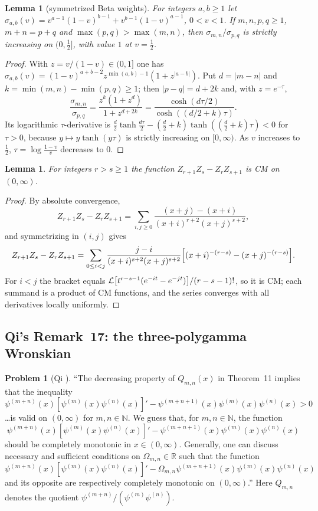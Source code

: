 \documentclass[11pt]{amsart}
\newtheorem{lemma}[theorem]{Lemma}
\theoremstyle{definition}
\newtheorem{problem}[theorem]{Problem}
\theoremstyle{remark}
\begin{document}
\begin{lemma}[symmetrized Beta weights]\label{R2:lem:cosh}
For integers $a,b\ge1$ let
$\sigma_{a,b}(v)=v^{a-1}(1-v)^{b-1}+v^{b-1}(1-v)^{a-1}$, $0<v<1$.
If $m,n,p,q\ge1$, $m+n=p+q$ and $\max(p,q)>\max(m,n)$, then
$\sigma_{m,n}/\sigma_{p,q}$ is strictly increasing on $(0,\tfrac12]$, with
value $1$ at $v=\tfrac12$.
\end{lemma}
\begin{proof}
With $z=v/(1-v)\in(0,1]$ one has
$\sigma_{a,b}(v)=(1-v)^{a+b-2}z^{\min(a,b)-1}(1+z^{|a-b|})$. Put $d=|m-n|$
and $k=\min(m,n)-\min(p,q)\ge1$; then $|p-q|=d+2k$ and, with $z=e^{-\tau}$,
\[
 \frac{\sigma_{m,n}}{\sigma_{p,q}}=\frac{z^k(1+z^d)}{1+z^{d+2k}}
 =\frac{\cosh(d\tau/2)}{\cosh((d/2+k)\tau)} .
\]
Its logarithmic $\tau$-derivative is
$\frac d2\tanh\frac{d\tau}2-(\frac d2+k)\tanh((\frac d2+k)\tau)<0$ for
$\tau>0$, because $y\mapsto y\tanh(y\tau)$ is strictly increasing on
$[0,\infty)$. As $v$ increases to $\frac12$, $\tau=\log\frac{1-v}{v}$
decreases to $0$.
\end{proof}

\begin{lemma}\label{R2:lem:hurwitz}
For integers $r>s\ge1$ the function $Z_{r+1}Z_s-Z_rZ_{s+1}$ is CM on
$(0,\infty)$.
\end{lemma}
\begin{proof}
By absolute convergence,
\[
 Z_{r+1}Z_s-Z_rZ_{s+1}=\sum_{i,j\ge0}\frac{(x+j)-(x+i)}{(x+i)^{r+2}(x+j)^{s+2}} ,
\]
and symmetrizing in $(i,j)$ gives
\[
 Z_{r+1}Z_s-Z_rZ_{s+1}=\sum_{0\le i<j}\frac{j-i}{(x+i)^{s+2}(x+j)^{s+2}}
 \Bigl[(x+i)^{-(r-s)}-(x+j)^{-(r-s)}\Bigr].
\]
For $i<j$ the bracket equals
$\mathcal{L}\bigl[t^{r-s-1}(e^{-it}-e^{-jt})\bigr]/(r-s-1)!$, so it is CM; each
summand is a product of CM functions, and the series converges with all
derivatives locally uniformly.
\end{proof}

\subsection{Qi's Remark~17: the three-polygamma Wronskian}
\label{R2:subsec:A}

\begin{problem}[{Qi \cite[Remark~17]{R2-QiCR2022}}]\label{R2:prob:A}
``The decreasing property of $Q_{m,n}(x)$ in Theorem~11 implies that the inequality
\[
 \psi^{(m+n)}(x)[\psi^{(m)}(x)\psi^{(n)}(x)]'-\psi^{(m+n+1)}(x)\psi^{(m)}(x)\psi^{(n)}(x)>0
\]
\dots is valid on $(0,\infty)$ for $m,n\in\mathbb N$. We guess that, for
$m,n\in\mathbb N$, the function
\[
 \psi^{(m+n)}(x)[\psi^{(m)}(x)\psi^{(n)}(x)]'-\psi^{(m+n+1)}(x)\psi^{(m)}(x)\psi^{(n)}(x)
\]
should be completely monotonic in $x\in(0,\infty)$. Generally, one can
discuss necessary and sufficient conditions on $\Omega_{m,n}\in\mathbb R$
such that the function
\[
 \psi^{(m+n)}(x)[\psi^{(m)}(x)\psi^{(n)}(x)]'-\Omega_{m,n}\psi^{(m+n+1)}(x)\psi^{(m)}(x)\psi^{(n)}(x)
\]
and its opposite are respectively completely monotonic on $(0,\infty)$.''
Here $Q_{m,n}$ denotes the quotient $\psi^{(m+n)}/(\psi^{(m)}\psi^{(n)})$.
\end{problem}
\end{document}
